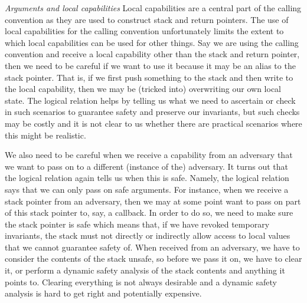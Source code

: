 \documentclass{llncs}
\begin{document}
\emph{Arguments and local capabilities} 
Local capabilities are a central part of the calling convention as they are used
to construct stack and return pointers. The use of local capabilities for the
calling convention unfortunately limits the extent to which local capabilities
can be used for other things. Say we are using the calling convention and
receive a local capability other than the stack and return pointer, then we need
to be careful if we want to use it because it may be an alias to the stack
pointer. That is, if we first push something to the stack and then write to the
local capability, then we may be (tricked into) overwriting our own local state.
The logical relation helps by telling us what we need to ascertain or check in
such scenarios to guarantee safety and preserve our invariants, but such checks
may be costly and it is not clear to us whether there are practical scenarios
where this might be realistic.

We also need to be careful when we receive a capability from an adversary that
we want to pass on to a different (instance of the) adversary. It turns out that
the logical relation again tells us when this is safe. Namely, the logical
relation says that we can only pass on safe arguments. For instance, when we
receive a stack pointer from an adversary, then we may at some point want to
pass on part of this stack pointer to, say, a callback. In order to do so, we
need to make sure the stack pointer is safe which means that, if we have revoked
temporary invariants, the stack must not directly or indirectly allow access to
local values that we cannot guarantee safety of. When received from an
adversary, we have to consider the contents of the stack unsafe, so before we
pass it on, we have to clear it, or perform a dynamic safety analysis of the
stack contents and anything it points to. Clearing everything is not always
desirable and a dynamic safety analysis is hard to get right and potentially
expensive.
\end{document}
